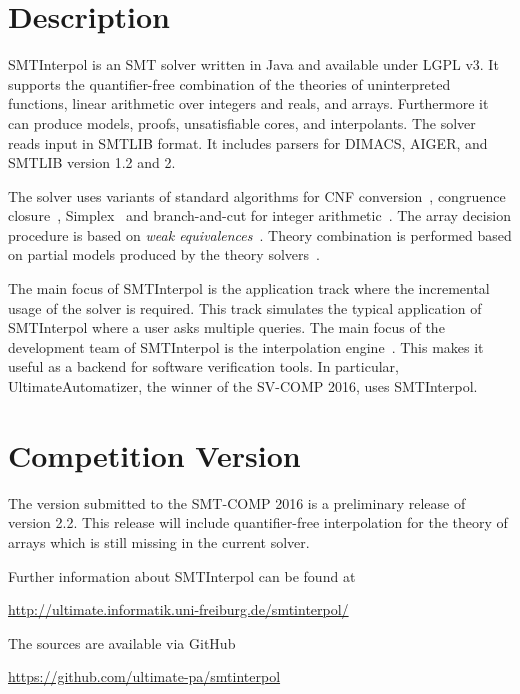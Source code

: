 \documentclass{article}
\title{\SI\\{\large Version \version}}
\author{J\"urgen Christ$^1$, Jochen Hoenicke$^2$, Tanja Schindler$^2$\\
  $^1$~Oracle Software Switzerland\\
  $^2$~University of Freiburg\\
  \texttt{\{hoenicke,schindle\}@informatik.uni-freiburg.de}}
\date{\today}
\newcommand\SI{SMTInterpol\xspace}
\begin{document}
\maketitle
\section*{Description}
\SI is an SMT solver written in Java and available under LGPL v3.  It supports
the quantifier-free combination of the theories of uninterpreted functions,
linear arithmetic over integers and reals, and arrays.  Furthermore it can
produce models, proofs, unsatisfiable cores, and interpolants.  The solver
reads input in SMTLIB format.  It includes parsers for DIMACS, AIGER, and
SMTLIB version 1.2 and 2.

The solver uses variants of standard algorithms for CNF
conversion~\cite{DBLP:journals/jsc/PlaistedG86}, congruence
closure~\cite{DBLP:conf/rta/NieuwenhuisO05}, Simplex~\cite{DBLP:conf/cav/DutertreM06} and
branch-and-cut for integer arithmetic~\cite{DBLP:conf/cav/ChristH15,DBLP:conf/cav/DilligDA09}.
The array decision procedure is based on \emph{weak equivalences}~\cite{DBLP:conf/frocos/ChristH15}.
Theory combination is performed based on partial models produced by the theory
solvers~\cite{DBLP:journals/entcs/MouraB08}.

The main focus of \SI is the application track where the incremental
usage of the solver is required.  This track simulates the typical
application of \SI where a user asks multiple queries.  The main focus
of the development team of \SI is the interpolation
engine~\cite{DBLP:conf/tacas/ChristHN13}.  This makes it useful as a
backend for software verification tools.  In particular,
Ultimate\-Automatizer, the winner of the SV-COMP 2016, uses \SI.

\section*{Competition Version}
The version submitted to the SMT-COMP 2016 is a preliminary release of version
2.2.  This release will include quantifier-free interpolation for the theory
of arrays which is still missing in the current solver.

Further information about \SI can be found at
\begin{center}
  \url{http://ultimate.informatik.uni-freiburg.de/smtinterpol/}
\end{center}
The sources are available via GitHub
\begin{center}
  \url{https://github.com/ultimate-pa/smtinterpol}
\end{center}
\end{document}

